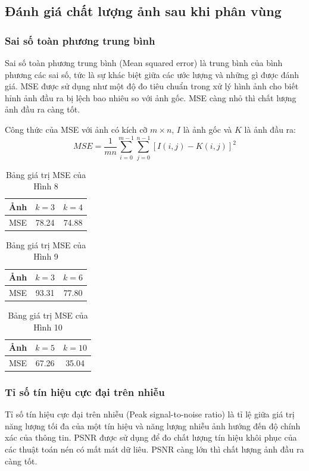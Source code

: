 \documentclass{article}
\begin{document}
    \subsection{Đánh giá chất lượng ảnh sau khi phân vùng}
    \subsubsection{Sai số toàn phương trung bình}
    Sai số toàn phương trung bình (Mean squared error) là trung bình của bình phương các sai số, tức là sự khác biệt giữa các ước lượng và những gì được đánh giá. MSE được sử dụng như một độ đo tiêu chuẩn trong xử lý hình ảnh cho biết hỉnh ảnh đầu ra bị lệch bao nhiêu so với ảnh gốc. MSE càng nhỏ thì chất lượng ảnh đầu ra càng tốt.

    Công thức của MSE với ảnh có kích cỡ $m \times n$, $I$ là ảnh gốc và $K$ là ảnh đầu ra:
    $$MSE = \frac{1}{mn} \sum\limits_{i=0}^{m-1} \sum\limits_{j=0}^{n-1} [I(i,j) - K(i,j)]^2$$

    \begin{table}[H]
        \centering
        \begin{tabular}{c|c|c}
            Ảnh & $k = 3$ & $k = 4$ \\
            \hline
            MSE & 78.24 & 74.88
        \end{tabular}
        \caption{Bảng giá trị MSE của Hình 8}
    \end{table}

    \begin{table}[H]
        \centering
            \begin{tabular}{c|c|c}
                Ảnh & $k = 3$ & $k = 6$ \\
                \hline
                MSE & 93.31 & 77.80
            \end{tabular}
        \caption{Bảng giá trị MSE của Hình 9}
    \end{table}

    \begin{table}[H]
        \centering
        \begin{tabular}{c|c|c}
            Ảnh & $k = 5$ & $k = 10$ \\
            \hline
            MSE & 67.26 & 35.04
        \end{tabular}
        \caption{Bảng giá trị MSE của Hình 10}
    \end{table}

    \subsubsection{Tỉ số tín hiệu cực đại trên nhiễu}
    Tỉ số tín hiệu cực đại trên nhiễu (Peak signal-to-noise ratio) là tỉ lệ giữa giá trị năng lượng tối đa của một tín hiệu và năng lượng nhiễu ảnh hướng đến độ chính xác của thông tin. PSNR được sử dụng để đo chất lượng tín hiệu khôi phục của các thuật toán nén có mất mát dữ liêu. PSNR càng lớn thì chất lượng ảnh đầu ra càng tốt.
    
\end{document}
